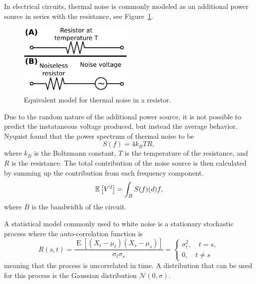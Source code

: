 In electrical circuits, thermal noise is commonly modeled as an additional
power source in series with the resistance, see Figure~\ref{fig:johnsonEquivalentNoise}.
\begin{figure}
  \centering
  \includegraphics[width=0.5\textwidth]{gfx/JohnsonNoiseEquivalentCircuits.png}
  \caption{Equivalent model for thermal noise in a resistor.}
  \label{fig:johnsonEquivalentNoise}
\end{figure}
Due to the random nature of the additional power source, it is not
possible to predict the instataneous voltage produced, but instead the
average behavior. Nyquist\cite{PhysRev.32.110} found that the power
spectrum of thermal noise to be
\begin{equation}
  \label{eq:power_spectrum_white_noise}
  S(f) = 4 k_B T R,
\end{equation}
where $k_B$ is the Boltzmann constant, $T$ is the temperature of the
resistance, and $R$ is the resistance. The total contribution of the
noise source is then calculated by summing up the contribution from
each frequency component.
\begin{equation}
  \label{eq:2}
  {\mathbb E} \left[ V^2 \right] = \int_B S(f) \mathrm(d) f,
\end{equation}
where $B$ is the bandwidth of the circuit.


A statistical model commonly used to white noise is a stationary stochastic
process where the auto-correlation function is
\begin{equation}
  \label{eq:autocorrelation_white_noise}
  R(s,t)={\frac {\operatorname {E} [(X_{t}-\mu _{t})(X_{s}-\mu
      _{s})]}{\sigma _{t}\sigma _{s}}} =
  \begin{cases}
    \sigma_{t}^2 , \quad t = s, \\
    0 , \quad t \neq s
  \end{cases}
\end{equation}
meaning that the process is uncorrelated in time. A distribution that
can be used for this process is the Gaussian distribution
$\mathcal{N}(0, \sigma)$.

